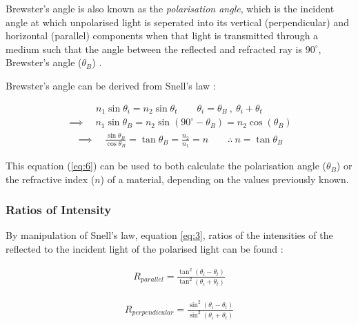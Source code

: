 \documentclass[12pt]{article}
\begin{document}
Brewster's angle is also known as the \textit{polarisation angle}, which is the incident angle at which unpolarised light is seperated into its vertical (perpendicular) and horizontal
(parallel) \break components when that light is transmitted through a medium such that the angle between the reflected and refracted ray is $90^{\circ}$, Brewster's angle ($\theta_B$)
\cite{scidirbrew, bostonbrew}.

Brewster's angle can be derived from Snell's law \cite{UCDlens,scidirbrew}:

\begin{gather} \label{eq:4}
    n_1 \sin \theta_i = n_2 \sin \theta_t \qquad \theta_i = \theta_B \: , \: \theta_i + \theta_t
\end{gather}
\begin{gather}\label{eq:5}
    \implies \quad n_1 \sin \theta_B = n_2 \sin (90^{\circ} - \theta_B) = n_2 \cos (\theta_B)
\end{gather}
\begin{gather} \label{eq:6}
    \implies \quad \frac{\sin \theta_B}{\cos \theta_B} = \tan \theta_B = \frac{n_2}{n_1} = n \qquad \therefore \: n = \tan \theta_B
\end{gather}

This equation (\ref{eq:6}) can be used to both calculate the polarisation angle ($\theta_B$) or the refractive index ($n$) of a material, depending on the values previously known.

\subsubsection{Ratios of Intensity} \label{sec:1.2.4}

By manipulation of Snell's law, equation \ref{eq:3}, ratios of the intensities of the reflected to the incident light of the polarised light can be found \cite{UCDlens}:

\begin{minipage}{.45\textwidth}
    \begin{gather} \label{eq:7}
        R_{parallel} = \frac{\tan^2 (\theta_i - \theta_t)}{\tan^2 (\theta_i + \theta_t)}
    \end{gather}
\end{minipage}
\hfill
\begin{minipage}{.45\textwidth}
    \begin{gather}
        R_{perpendicular} = \frac{\sin^2 (\theta_i - \theta_t)}{\sin^2 (\theta_i + \theta_t)}
    \end{gather}
\end{minipage}
\end{document}

